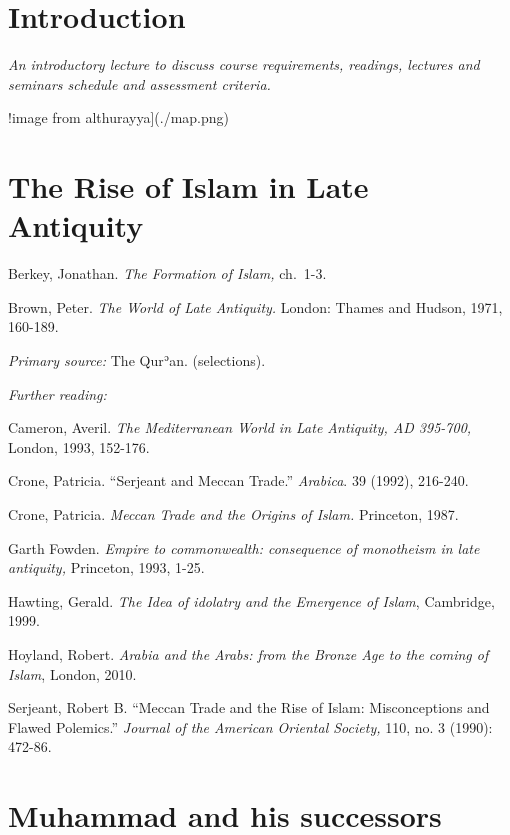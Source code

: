 \documentclass[
]{book}
\begin{document}
\hypertarget{introduction}{%
\chapter{Introduction}\label{introduction}}

\emph{An introductory lecture to discuss course requirements, readings, lectures and seminars schedule and assessment criteria.}

!image from althurayya{]}(./map.png)

\hypertarget{the-rise-of-islam-in-late-antiquity}{%
\chapter{The Rise of Islam in Late Antiquity}\label{the-rise-of-islam-in-late-antiquity}}

Berkey, Jonathan. \emph{The Formation of Islam,} ch.~1-3.

Brown, Peter. \emph{The World of Late Antiquity.} London: Thames and Hudson,
1971, 160-189.

\emph{Primary source:} The Qurʾan. (selections).

\emph{Further reading:}

Cameron, Averil. \emph{The Mediterranean World in Late Antiquity, AD 395-700,} London, 1993, 152-176.

Crone, Patricia. ``Serjeant and Meccan Trade.'' \emph{Arabica}. 39 (1992), 216-240.

Crone, Patricia. \emph{Meccan Trade and the Origins of Islam.} Princeton, 1987.

Garth Fowden. \emph{Empire to commonwealth: consequence of monotheism in late antiquity,} Princeton, 1993, 1-25.

Hawting, Gerald. \emph{The Idea of idolatry and the Emergence of Islam}, Cambridge, 1999.

Hoyland, Robert. \emph{Arabia and the Arabs: from the Bronze Age to the coming of Islam}, London, 2010.

Serjeant, Robert B. ``Meccan Trade and the Rise of Islam: Misconceptions
and Flawed Polemics.'' \emph{Journal of the American Oriental Society,} 110, no. 3 (1990): 472-86.

\hypertarget{muhammad-and-his-successors}{%
\chapter{Muhammad and his successors}\label{muhammad-and-his-successors}}
\end{document}
